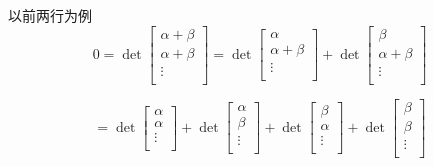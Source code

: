 \documentclass[UTF8]{ctexart}
\DeclareMathOperator{\0}{\mathbf{0}}
\DeclareMathOperator{\<}{\langle}
\renewcommand{\>}{\rangle}
\begin{document}
    \begin{prf}
        以前两行为例
        \[
    0 = \det\begin{bmatrix}
        \alpha+\beta  \\
        \alpha+\beta  \\
        \vdots   \\
        
    \end{bmatrix} 
    = \det  \begin{bmatrix}
        \alpha\\
        \alpha+\beta \\
        \vdots  \\
        
    \end{bmatrix} 
    + \det \begin{bmatrix}
        \beta  \\
        \alpha+\beta  \\
        \vdots  \\
        
    \end{bmatrix} 
    \]

    \[
    = \det \begin{bmatrix}
        \alpha   \\
        \alpha \\
        \vdots  \\
    
    \end{bmatrix} 
    + \det \begin{bmatrix}
    \alpha\\
        \beta \\
        \vdots  \\

    \end{bmatrix} 
    + \det \begin{bmatrix}
    \beta  \\
        \alpha   \\
        \vdots\\
    
    \end{bmatrix} 
    + \det \begin{bmatrix}
    \beta   \\
        \beta  \\
        \vdots  \\
    
    \end{bmatrix} 
    \]


\end{prf}
\end{document}
